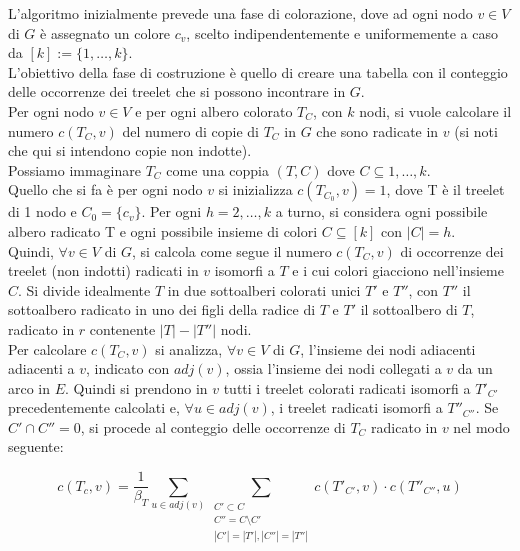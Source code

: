 L'algoritmo inizialmente prevede una fase di colorazione, dove ad ogni nodo $ v \in V $ di $ G $ \`e assegnato un colore $ c_v $, scelto indipendentemente e uniformemente a caso da $ [k] := \{1, \dots ,k\} $.\\
L'obiettivo della fase di costruzione \`e quello di creare una tabella con il conteggio delle occorrenze dei treelet che si possono incontrare in $ G $.\\
Per ogni nodo $ v \in V $ e per ogni albero colorato $ T_C $, con $ k $ nodi, si vuole calcolare il numero $ c(T_C , v) $ del numero di copie di $ T_C $  in $ G $ che sono radicate in $ v $ (si noti che qui si intendono copie non indotte).\\
Possiamo immaginare $ T_C $ come una coppia $ (T,C) $ dove $ C \subseteq {1,\dots,k} $.\\
Quello che si fa \`e per ogni nodo $ v $ si inizializza $ c(T_{C_0} , v) = 1 $, dove T \`e il treelet di 1 nodo e $ C_0 = \{c_v\} $.
Per ogni $ h = 2,\dots,k $ a turno, si considera ogni possibile albero radicato T e ogni possibile insieme di colori $ C \subseteq [k] $ con $ |C| = h $.\\
Quindi, $ \forall v \in V$ di $ G $, si calcola come segue il numero $ c(T_C,v) $ di occorrenze dei treelet (non indotti) radicati in $ v $ isomorfi a $ T $ e i cui colori giacciono nell'insieme $ C $. Si divide idealmente $ T $ in due sottoalberi colorati unici $ T' $ e $ T'' $, con $ T'' $ il sottoalbero radicato in uno dei figli della radice di $ T $ e $ T' $ il sottoalbero di $ T $, radicato in $ r $ contenente $ |T| - |T''| $ nodi.\\
Per calcolare $ c(T_C,v) $ si analizza, $ \forall v \in V $ di $ G $, l'insieme dei nodi adiacenti adiacenti a $ v $, indicato con $ adj(v) $, ossia l'insieme dei nodi collegati a $ v $ da un arco in $ E $.
Quindi si prendono in $ v $ tutti i treelet colorati radicati isomorfi a $ T'_{C'} $ precedentemente calcolati e, $ \forall u \in adj(v) $, i treelet radicati isomorfi a $ T''_{C''} $.
Se $ C' \cap C'' = 0 $, si procede al conteggio delle occorrenze di $ T_C $ radicato in $ v $ nel modo seguente:

\begin{equation}\label{conta}
	c(T_c,v)=\frac{1}{\beta_T}\sum_{u \in adj(v)}\sum_{\substack{C' \subset C \\C'' = C \setminus C' \\ |C'|=|T'|, |C''| = |T''|}}c(T'_{C'},v)\cdot c(T''_{C''},u)
\end{equation}

